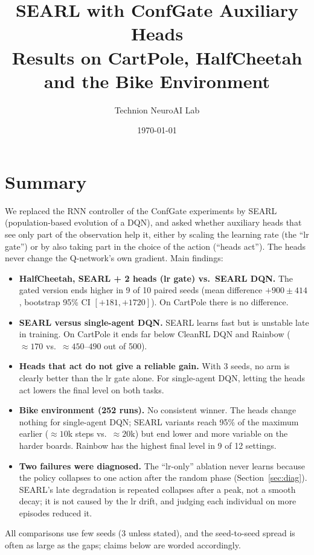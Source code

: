 \documentclass[11pt]{article}
\title{%
  \textbf{SEARL with ConfGate Auxiliary Heads}\\[4pt]
  \large Results on CartPole, HalfCheetah and the Bike Environment}
\author{Technion NeuroAI Lab}
\date{\today}
\begin{document}
\maketitle

\section{Summary}
We replaced the RNN controller of the ConfGate experiments by SEARL (population-based evolution of a DQN),
and asked whether auxiliary heads that see only part of the observation help it, either by scaling the
learning rate (the ``lr gate'') or by also taking part in the choice of the action (``heads act'').
The heads never change the Q-network's own gradient. Main findings:

\begin{itemize}
  \item \textbf{HalfCheetah, SEARL + 2 heads (lr gate) vs.\ SEARL DQN.} The gated version ends higher in 9 of 10 paired
        seeds (mean difference $+900 \pm 414$, bootstrap 95\% CI $[+181, +1720]$). On CartPole there is no difference.
  \item \textbf{SEARL versus single-agent DQN.} SEARL learns fast but is unstable late in training. On CartPole it ends
        far below CleanRL DQN and Rainbow ($\approx 170$ vs.\ $\approx 450$--$490$ out of 500).
  \item \textbf{Heads that act do not give a reliable gain.} With 3 seeds, no arm is clearly better than the lr gate
        alone. For single-agent DQN, letting the heads act lowers the final level on both tasks.
  \item \textbf{Bike environment (252 runs).} No consistent winner. The heads change nothing for single-agent DQN;
        SEARL variants reach 95\% of the maximum earlier ($\approx 10$k steps vs.\ $\approx 20$k) but end lower and more
        variable on the harder boards. Rainbow has the highest final level in 9 of 12 settings.
  \item \textbf{Two failures were diagnosed.} The ``lr-only'' ablation never learns because the policy collapses to one
        action after the random phase (Section~\ref{sec:diag}). SEARL's late degradation is repeated collapses after a
        peak, not a smooth decay; it is not caused by the lr drift, and judging each individual on more episodes
        reduced it.
\end{itemize}
All comparisons use few seeds (3 unless stated), and the seed-to-seed spread is often as large as the gaps; claims
below are worded accordingly.
\end{document}
